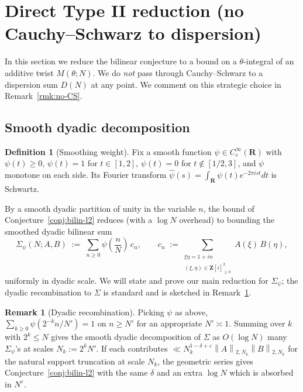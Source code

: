 \documentclass[11pt]{article}
\theoremstyle{definition}
\newtheorem{definition}[theorem]{Definition}
\newtheorem{remark}[theorem]{Remark}
\newcommand{\Z}{\mathbf{Z}}
\newcommand{\R}{\mathbf{R}}
\newcommand{\Zi}{\Z[i]}
\newcommand{\norm}[1]{\left\lVert #1\right\rVert}
\begin{document}

\section{Direct Type II reduction (no Cauchy--Schwarz to dispersion)}\label{sec:type-II}

In this section we reduce the bilinear conjecture to a bound on a $\theta$-integral of an additive twist $M(\theta;N)$. We do \emph{not} pass through Cauchy--Schwarz to a dispersion sum $D(N)$ at any point. We comment on this strategic choice in Remark~\ref{rmk:no-CS}.

\subsection{Smooth dyadic decomposition}\label{ssec:typeII-smooth}

\begin{definition}[Smoothing weight]\label{def:psi}
Fix a smooth function $\psi\in C_c^\infty(\R)$ with $\psi(t)\ge 0$, $\psi(t)=1$ for $t\in[1,2]$, $\psi(t)=0$ for $t\notin[1/2,3]$, and $\psi$ monotone on each side. Its Fourier transform $\widehat\psi(s)=\int_\R\psi(t)e^{-2\pi i st}dt$ is Schwartz.
\end{definition}

By a smooth dyadic partition of unity in the variable $n$, the bound of Conjecture~\ref{conj:bilin-l2} reduces (with a $\log N$ overhead) to bounding the smoothed dyadic bilinear sum
\begin{equation}\label{eq:Sigma-psi-def}
\Sigma_\psi(N;A,B)\;:=\;\sum_{n\ge 0}\psi\!\left(\frac{n}{N}\right)\,c_n,\qquad c_n\;:=\sum_{\substack{\xi\eta=1+in\\(\xi,\eta)\in\Zi_{\ge 0}^2}}A(\xi)\,B(\eta),
\end{equation}
uniformly in dyadic scale. We will state and prove our main reduction for $\Sigma_\psi$; the dyadic recombination to $\Sigma$ is standard and is sketched in Remark~\ref{rmk:dyadic-recombine}.

\begin{remark}[Dyadic recombination]\label{rmk:dyadic-recombine}
Picking $\psi$ as above, $\sum_{k\ge 0}\psi(2^{-k}n/N')=1$ on $n\ge N'$ for an appropriate $N'\asymp 1$. Summing over $k$ with $2^k\le N$ gives the smooth dyadic decomposition of $\Sigma$ as $O(\log N)$ many $\Sigma_\psi$'s at scales $N_k:=2^k N'$. If each contributes $\ll N_k^{1-\delta+\varepsilon}\norm{A}_{2,N_k}\norm{B}_{2,N_k}$ for the natural support truncation at scale $N_k$, the geometric series gives Conjecture~\ref{conj:bilin-l2} with the same $\delta$ and an extra $\log N$ which is absorbed in $N^\varepsilon$.
\end{remark}
\end{document}

